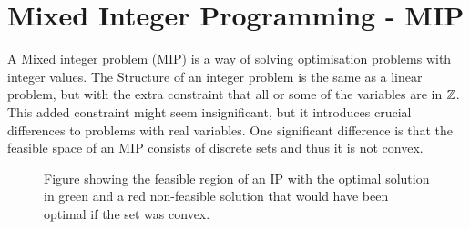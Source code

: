 \section{Mixed Integer Programming - MIP}
A Mixed integer problem (MIP) is a way of solving optimisation problems with integer values. The Structure of an integer problem is the same as a linear problem, but with the extra constraint that all or some of the variables are in $\mathbb{Z}$. This added constraint might seem insignificant, but it introduces crucial differences to problems with real variables. One significant difference is that the feasible space of an MIP consists of discrete sets and thus it is not convex.
\begin{figure}[H]
\centering
{}
\caption{Figure showing the feasible region of an IP with the optimal solution in green and a red non-feasible solution that would have been optimal if the set was convex.}
\end{figure}
